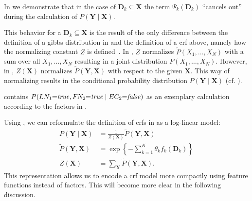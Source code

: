 In  we demonstrate that in the case of $\mathbf{D}_k\subseteq \mathbf{X}$ the term $\Psi_k(\mathbf{D}_k)$ ``cancels out'' during the calculation of $P(\mathbf{Y}\mid\mathbf{X})$.

This behavior for a $\mathbf{D}_k\subseteq\mathbf{X}$ is the result of the only difference between the definition of a \gls{gibbs distribution} in  and the definition of a \gls{crf} above, namely how the normalizing constant $Z$ is defined~\citep{koller2009probabilistic}.
In , $Z$ normalizes $\tilde{P}(X_1,\dots,X_N)$ with a sum over all $X_1,\dots,X_N$ resulting in a \gls{joint distribution} $P(X_1,\dots,X_N)$.
However, in , $Z(\mathbf{X})$ normalizes $\tilde{P}(\mathbf{Y},\mathbf{X})$ with respect to the given $\mathbf{X}$.
This way of normalizing results in the \gls{conditional probability distribution} $P(\mathbf{Y}\mid\mathbf{X})$ (cf. ).

 contains $P(LN_1{=}\mathit{true},F\hspace{-0.07em} N_2{=}\mathit{true}\mid EC_2{=}\mathit{false})$ as an exemplary calculation according to the \glspl{factor} in .

\bigskip

Using , we can reformulate the definition of \glspl{crf} in  as a \gls{log-linear model}:
\begin{equation}
  \label{equ:crf-log-linear}
  \begin{split}
    P(\mathbf{Y}\mid\mathbf{X}) & = \frac{1}{Z(\mathbf{X})}\tilde{P}(\mathbf{Y},\mathbf{X}) \\
    \tilde{P}(\mathbf{Y},\mathbf{X}) & = \exp\left\{ -\sum_{k=1}^K \theta_k f_k\left(\mathbf{D}_k\right)\right\} \\
    Z(\mathbf{X}) & = \sum_{\mathbf{Y}}\tilde{P}(\mathbf{Y},\mathbf{X}).
  \end{split}
\end{equation}
This representation allows us to encode a \gls{crf} model more compactly using \glspl{feature function} instead of \glspl{factor}.
This will become more clear in the following discussion.

\bigskip


